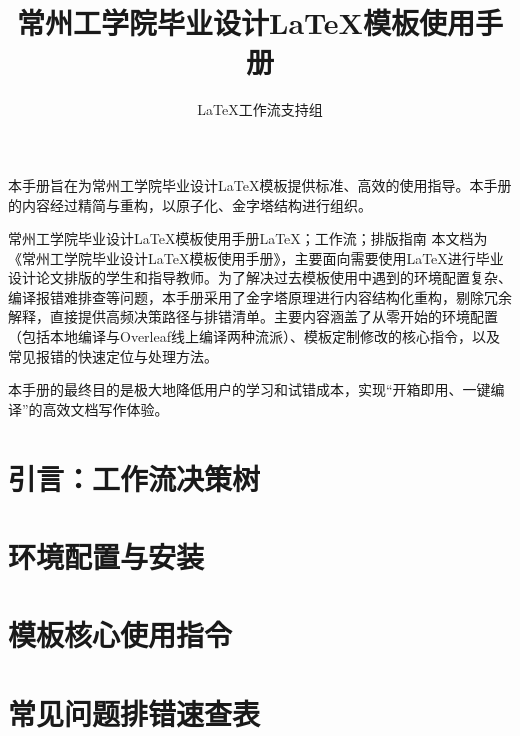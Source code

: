 \documentclass[12pt]{graduate-design-manual}
\title{常州工学院毕业设计LaTeX模板使用手册}
\author{LaTeX工作流支持组}
\begin{document}
\makecover

\begin{originalitystatement}
本手册旨在为常州工学院毕业设计LaTeX模板提供标准、高效的使用指导。本手册的内容经过精简与重构，以原子化、金字塔结构进行组织。
\end{originalitystatement}

\begin{cnabstract}{常州工学院毕业设计LaTeX模板使用手册}{LaTeX；工作流；排版指南}
    本文档为《常州工学院毕业设计LaTeX模板使用手册》，主要面向需要使用LaTeX进行毕业设计论文排版的学生和指导教师。为了解决过去模板使用中遇到的环境配置复杂、编译报错难排查等问题，本手册采用了金字塔原理进行内容结构化重构，剔除冗余解释，直接提供高频决策路径与排错清单。主要内容涵盖了从零开始的环境配置（包括本地编译与Overleaf线上编译两种流派）、模板定制修改的核心指令，以及常见报错的快速定位与处理方法。
    
    本手册的最终目的是极大地降低用户的学习和试错成本，实现“开箱即用、一键编译”的高效文档写作体验。
\end{cnabstract}

\contents
{}
\mainbody

\section{引言：工作流决策树}


\section{环境配置与安装}


\section{模板核心使用指令}


\section{常见问题排错速查表}

\end{document}
